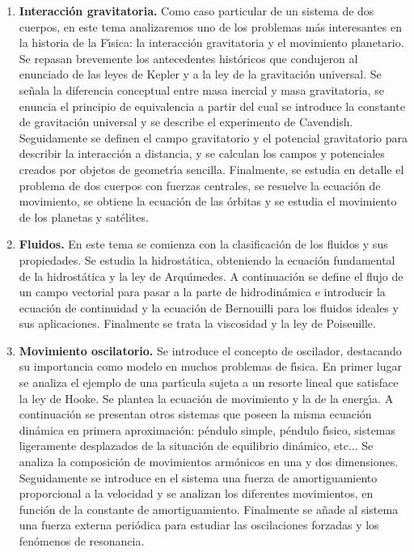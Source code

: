 \begin{enumerate} [{\bf 1. }]
\item {\bf  Interacci\'{o}n gravitatoria.}
Como caso particular de un sistema de dos cuerpos, en este tema analizaremos uno
 de los problemas m\'{a}s interesantes en la historia de la F\'{\i}sica:
 la interacci\'{o}n gravitatoria y el movimiento planetario. 
Se repasan brevemente los antecedentes hist\'{o}ricos que condujeron al 
enunciado de las leyes de Kepler y a la ley de la gravitaci\'{o}n universal.
 Se se\~{n}ala la diferencia conceptual entre masa inercial y masa gravitatoria,
 se enuncia el principio de equivalencia a partir del cual se introduce la
 constante de gravitaci\'{o}n universal y se describe el experimento 
 de Cavendish.
 Seguidamente se definen el campo gravitatorio y el potencial gravitatorio 
para describir la interacci\'{o}n a distancia, y se calculan los campos y
 potenciales creados por objetos de geometr\'{\i}a sencilla. Finalmente,
se estudia en detalle el problema de dos cuerpos con fuerzas centrales, se resuelve 
la ecuaci\'{o}n de movimiento, se obtiene la ecuaci\'{o}n de las \'{o}rbitas
y se estudia el movimiento de los planetas y sat\'{e}lites.


\item {\bf  Fluidos.}
En este tema se comienza con la clasificaci\'{o}n de los fluidos y sus propiedades.
 Se estudia la hidrost\'{a}tica, obteniendo la ecuaci\'{o}n fundamental de la 
hidrost\'{a}tica y la ley de Arqu\'{\i}medes. A continuaci\'{o}n se define 
el flujo de un campo vectorial para pasar a la parte de hidrodin\'{a}mica e 
introducir la ecuaci\'{o}n de continuidad y 
la ecuaci\'{o}n de Bernouilli para los fluidos ideales y sus aplicaciones.
Finalmente se trata la viscosidad y la ley de Poiseuille.

\item {\bf  Movimiento oscilatorio.}
Se introduce el concepto de oscilador, destacando su importancia como 
modelo en muchos problemas de f\'{\i}sica. En primer lugar se analiza el
 ejemplo de una part\'{\i}cula sujeta a un resorte lineal que satisface la
 ley de Hooke.
 Se plantea la ecuaci\'{o}n de movimiento y la de la energ\'{\i}a. 
A continuaci\'{o}n se
 presentan otros sistemas que poseen la misma ecuaci\'{o}n din\'{a}mica en primera 
aproximaci\'{o}n: p\'{e}ndulo simple, p\'{e}ndulo f\'{\i}sico, 
sistemas ligeramente desplazados
 de la situaci\'{o}n de equilibrio din\'{a}mico, etc... 
Se analiza la composici\'{o}n de movimientos arm\'{o}nicos en una y dos dimensiones.
 Seguidamente se introduce en el sistema una fuerza de amortiguamiento proporcional
 a la velocidad y se analizan los diferentes movimientos, en funci\'{o}n 
de la constante de amortiguamiento. 
Finalmente se a\~{n}ade al sistema una fuerza externa peri\'{o}dica para estudiar
 las oscilaciones forzadas y los fen\'{o}menos de resonancia.




\end{enumerate}
